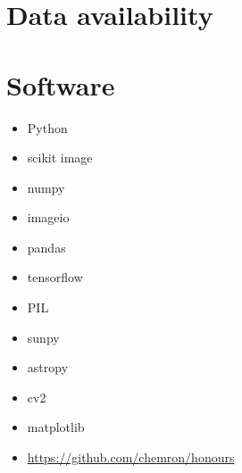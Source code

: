 \documentclass[11pt,a4paper,onecolumn]{report}
\begin{document}
\section{Data availability}

\section{Software}
\begin{itemize}
  \item Python
  \item scikit image \cite{van_der_walt_scikit-image_2014}
  \item numpy
  \item imageio
  \item pandas
  \item tensorflow
  \item PIL
  \item sunpy
  \item astropy
  \item cv2
  \item matplotlib
  \item \url{https://github.com/chemron/honours}
\end{itemize}











\end{document}
